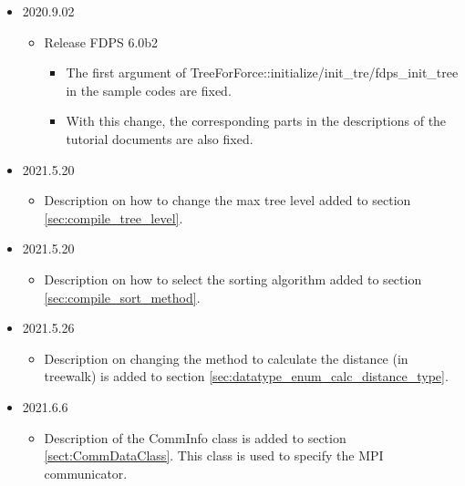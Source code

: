 \begin{itemize}
  \item 2020.9.02
    \begin{itemize}
    \item Release FDPS 6.0b2
       \begin{itemize}
          \item The first argument of TreeForForce::initialize/init\_tre/fdps\_init\_tree in the sample codes are fixed.
          \item With this change, the corresponding parts in the descriptions of the tutorial documents are also fixed.
       \end{itemize}
    \end{itemize}

  \item 2021.5.20
    \begin{itemize}
    \item Description on how to change the max tree level added to
      section \ref{sec:compile_tree_level}.
    \end{itemize}

  \item 2021.5.20
    \begin{itemize}
    \item Description on how to select the sorting algorithm added to
      section \ref{sec:compile_sort_method}.
    \end{itemize}

  \item 2021.5.26
    \begin{itemize}
    \item Description on changing the method to calculate the distance
      (in treewalk) is added to section
      \ref{sec:datatype_enum_calc_distance_type}. 
    \end{itemize}

  \item 2021.6.6
    \begin{itemize}
    \item Description of the CommInfo class is added to section
      \ref{sect:CommDataClass}. This class  is
      used to specify the MPI communicator. 
      
    \end{itemize}


\end{itemize}
